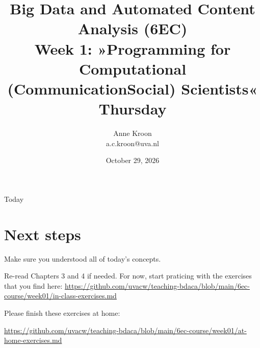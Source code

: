 \documentclass[compress]{beamer}
\begin{document}
\title[Big Data and Automated Content Analysis]{\textbf{Big Data and Automated Content Analysis (6EC)} 
\\Week 1: »Programming for Computational (Communication\textbar Social) Scientists«
\\Thursday }
\author[Anne Kroon]{Anne Kroon\\ \footnotesize{a.c.kroon@uva.nl}}
\date{October 29, 2026}

\begin{frame}{}
	\titlepage
\end{frame}

\begin{frame}{Today}
	\tableofcontents
\end{frame}






\section{Next steps}


\begin{frame}[standout]
Make sure you understood all of today's concepts.

Re-read Chapters 3 and 4 if needed.
For now, start praticing with the exercises that you find here:
\large{\url{https://github.com/uvacw/teaching-bdaca/blob/main/6ec-course/week01/in-class-exercises.md}}

Please finish these exercises at home: 

\large{\url{https://github.com/uvacw/teaching-bdaca/blob/main/6ec-course/week01/at-home-exercises.md}}
\end{frame}
\end{document}
